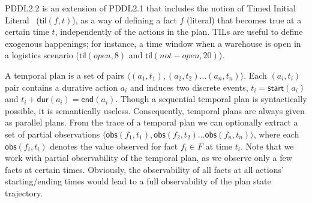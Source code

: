 \documentclass[runningheads]{llncs}
\newcommand{\tup}[1]{{\langle #1 \rangle}}
\newcommand{\dur}{\mathsf{dur}}    %
\newcommand{\obs}{\mathsf{obs}}    %
\newcommand{\start}{\mathsf{start}}%
\newcommand{\en}{\mathsf{end}}     %
\newcommand{\til}{\mathsf{til}}    %
\begin{document}
PDDL2.2 is an extension of PDDL2.1 that includes the notion of Timed Initial Literal~\cite{hoffmann2005} ($\til(f,t)$), as a way of defining a fact $f$ (literal) that becomes true at a certain time $t$, independently of the actions in the plan. TILs are useful to define exogenous happenings; for instance, a time window when a warehouse is open in a logistics scenario ($\til(open,8)$ and $\til(not-open,20)$).

A temporal plan is a set of pairs $\tup{(a_1,t_1),(a_2,t_2)\ldots (a_n,t_n)}$. Each $(a_i,t_i)$ pair contains a durative action $a_i$ and induces two discrete events, $t_i=\start(a_i)$ and $t_i+\dur(a_i)=\en(a_i)$. Though a sequential temporal plan is syntactically possible, it is semantically useless. Consequently, temporal plans are always given as parallel plans.
From the trace of a temporal plan we can optionally extract a set of partial observations $\tup{\obs(f_1,t_1),\obs(f_2,t_2)\ldots \obs(f_n,t_n)}$, where each $\obs(f_i,t_i)$ denotes the value observed for fact $f_i \in F$ at time $t_i$. Note that we work with partial observability of the temporal plan, as we observe only a few facts at certain times. Obviously, the observability of all facts at all actions' starting/ending times would lead to a full observability of the plan state trajectory.
\end{document}
